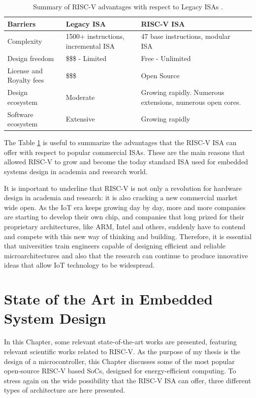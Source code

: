 \begin{table}
\centering
\begin{tabular}{| p{4cm} | p{4cm} | p{4cm} | p{4cm} |}
 \hline
 \textbf{Barriers} & \textbf{Legacy ISA} & \textbf{RISC-V ISA}\\ \hline
 \hline\hline
 Complexity & 1500+ instructions, incremental ISA & 47 base instructions, modular ISA \\ 
 \hline
 Design freedom & \$\$\$ - Limited & Free - Unlimited  \\
 \hline
 License and Royalty fees & \$\$\$  & Open Source  \\
 \hline
 Design ecosystem & Moderate & Growing rapidly. Numerous extensions, numerous open cores. \\
 \hline
 Software ecosystem & Extensive & Growing rapidly \\
 \hline
\end{tabular}
\caption{Summary of RISC-V advantages with respect to Legacy ISAs \cite{riscvIntro}.}
\label{tab:legacy} %
\end{table} 

The Table \ref{tab:legacy} is useful to summarize the advantages that the RISC-V ISA can offer with respect to popular commercial ISAs. These are the main reasons that allowed RISC-V to grow and become the today standard ISA used for embedded systems design in academia and research world.

It is important to underline that RISC-V is not only a revolution for hardware design in academia and research: it is also cracking a new commercial market wide open. As the IoT era keeps growing day by day, more and more companies are starting to develop their own chip, and companies that long prized for their proprietary architectures, like ARM, Intel and others, suddenly have to contend and compete with this new way of thinking and building. Therefore, it is essential that universities train engineers capable of designing efficient and reliable microarchitectures and also that the research can continue to produce innovative ideas that allow IoT technology to be widespread.

\section{State of the Art in Embedded System Design}
In this Chapter, some relevant state-of-the-art works are presented, featuring relevant scientific works related to RISC-V. As the purpose of my thesis is the design of a microcontroller, this Chapter discusses some of the most popular open-source RISC-V based SoCs, designed for energy-efficient computing. To stress again on the wide possibility that the RISC-V ISA can offer, three different types of architecture are here presented. 

